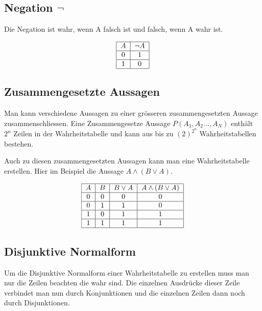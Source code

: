\documentclass[12pt, a4paper, oneside]{article}
\begin{document}
\subsection{Negation $\lnot$}
Die Negation ist wahr, wenn A falsch ist und falsch, wenn A wahr ist.

\begin{equation}
  \begin{tabular}{|c |c |}
    \hline
    $A$ & $\lnot A$ \\ \hline
    0 & 1 \\ \hline
    1 & 0 \\ \hline
  \end{tabular}
\end{equation}


\subsection{Zusammengesetzte Aussagen}
Man kann verschiedene Aussagen zu einer grösseren zusammengesetzten Aussage zusammenschliessen. Eine Zusammengesetze Aussage $P(A_{1}, A_{2}..., A_{N})$ enthält $2^{n}$ Zeilen in der Wahrheitstabelle und kann aus bis zu $(2)^{2^{n}}$ Wahrheitstabellen bestehen.

Auch zu diesen zusammengesetzten Aussagen kann man eine Wahrheitstabelle erstellen. Hier im Beispiel die Aussage $A \land (B \lor A)$.

\begin{equation}
  \begin{tabular}{| c | c | c | c |}
    \hline
    $A$ & $B$ & $B \lor A$ & $A \land (B \lor A)$ \\ \hline
    0 & 0 & 0 & 0 \\ \hline
    0 & 1 & 1 & 0 \\ \hline
    1 & 0 & 1 & 1 \\ \hline
    1 & 1 & 1 & 1 \\ \hline
  \end{tabular}
\end{equation}

\newpage
\subsection{Disjunktive Normalform}
Um die Disjunktive Normalform einer Wahrheitstabelle zu erstellen muss man nur die Zeilen beachten die wahr sind. Die einzelnen Ausdrücke dieser Zeile verbindet man nun durch Konjunktionen und die einzelnen Zeilen dann noch durch Disjunktionen. 
\end{document}
